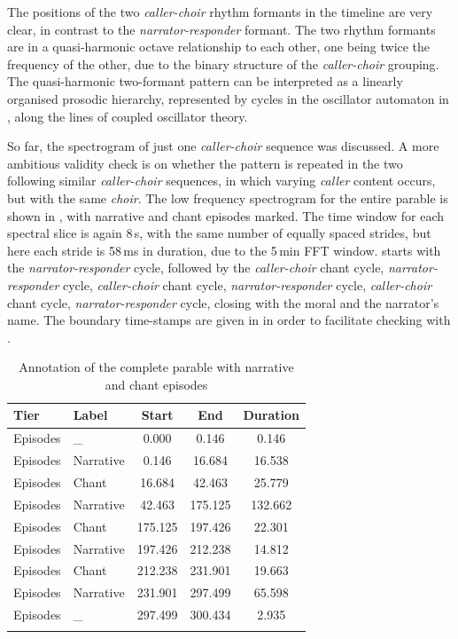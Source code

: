 \documentclass[output=paper,colorlinks,citecolor=brown]{langscibook}
\begin{document}
The positions of the two \textit{caller-choir} rhythm formants in the timeline are very clear, in contrast to the \textit{narrator-responder} formant. The two rhythm formants are in a quasi-harmonic octave relationship to each other, one being twice the frequency of the other, due to the binary structure of the \textit{caller-choir} grouping. The quasi-harmonic two-formant pattern can be interpreted as a linearly organised prosodic hierarchy, represented by cycles in the oscillator automaton in , along the lines of coupled oscillator theory.

So far, the spectrogram of just one \textit{caller-choir} sequence was discussed. A more ambitious validity check is on whether the pattern is repeated in the two following similar \textit{caller-choir} sequences, in which varying \textit{caller} content occurs, but with the same \textit{choir}. The low frequency spectrogram for the entire parable is shown in , with narrative and chant episodes marked. The time window for each spectral slice is again 8\,s, with the same number of equally spaced strides, but here each stride is 58\,ms in duration, due to the 5\,min FFT window.  starts with the \textit{narrator-responder} cycle, followed by the \textit{caller-choir} chant cycle, \textit{narrator-responder} cycle, \textit{caller-choir} chant cycle, \textit{narrator-responder} cycle, \textit{caller-choir} chant cycle, \textit{narrator-responder} cycle, closing with the moral and the narrator's name. The boundary time-stamps are given in  in order to facilitate checking with .

\begin{table}
\caption{Annotation of the complete parable with narrative and chant episodes}
\label{table:table02}
\begin{tabular}{ll *3{S[table-format=3.3]}}
\lsptoprule
Tier        & Label         & {Start} & {End} & {Duration}\\\midrule
Episodes	&	\_	        &	0.000	&	0.146	&	0.146\\
Episodes	&	Narrative	&	0.146	&	16.684	&	16.538\\
Episodes	&	Chant	&	16.684	&	42.463	&	25.779\\
Episodes	&	Narrative	&	42.463	&	175.125	&	132.662\\
Episodes	&	Chant	&	175.125	&	197.426	&	22.301\\
Episodes	&	Narrative	&	197.426	&	212.238	&	14.812\\
Episodes	&	Chant	&	212.238	&	231.901	&	19.663\\
Episodes	&	Narrative	&	231.901	&	297.499	&	65.598\\
Episodes	&	\_	&	297.499	&	300.434	&	2.935\\
\lspbottomrule
\end{tabular}
\end{table}
\end{document}
